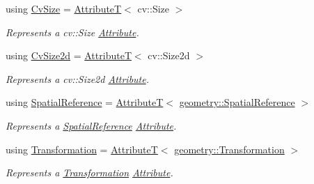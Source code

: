 \begin{DoxyCompactItemize}
using \hyperlink{group___geometry_attributes_gae0e04903bac2efafa10d940b1d5df9ff}{Cv\+Size} = \hyperlink{structdg_1_1deepcore_1_1_attribute_t}{AttributeT}$<$ cv\+::\+Size $>$
\begin{DoxyCompactList}\small\item\em Represents a {\ttfamily cv\+::\+Size} \hyperlink{classdg_1_1deepcore_1_1_attribute}{Attribute}. \end{DoxyCompactList}\item 
using \hyperlink{group___geometry_attributes_ga0e6cae95e97b779779d47e2327f55521}{Cv\+Size2d} = \hyperlink{structdg_1_1deepcore_1_1_attribute_t}{AttributeT}$<$ cv\+::\+Size2d $>$
\begin{DoxyCompactList}\small\item\em Represents a {\ttfamily cv\+::\+Size2d} \hyperlink{classdg_1_1deepcore_1_1_attribute}{Attribute}. \end{DoxyCompactList}\item 
using \hyperlink{group___geometry_attributes_gacd86ea85438c9807d4ab646c9f98a5c1}{Spatial\+Reference} = \hyperlink{structdg_1_1deepcore_1_1_attribute_t}{AttributeT}$<$ \hyperlink{classdg_1_1deepcore_1_1geometry_1_1_spatial_reference}{geometry\+::\+Spatial\+Reference} $>$
\begin{DoxyCompactList}\small\item\em Represents a \hyperlink{classdg_1_1deepcore_1_1geometry_1_1_spatial_reference}{Spatial\+Reference} \hyperlink{classdg_1_1deepcore_1_1_attribute}{Attribute}. \end{DoxyCompactList}\item 
using \hyperlink{group___geometry_attributes_ga0ff2f8043ad91558a37326d1ee3e4331}{Transformation} = \hyperlink{structdg_1_1deepcore_1_1_attribute_t}{AttributeT}$<$ \hyperlink{structdg_1_1deepcore_1_1geometry_1_1_transformation}{geometry\+::\+Transformation} $>$
\begin{DoxyCompactList}\small\item\em Represents a \hyperlink{structdg_1_1deepcore_1_1geometry_1_1_transformation}{Transformation} \hyperlink{classdg_1_1deepcore_1_1_attribute}{Attribute}. \end{DoxyCompactList}\end{DoxyCompactItemize}

